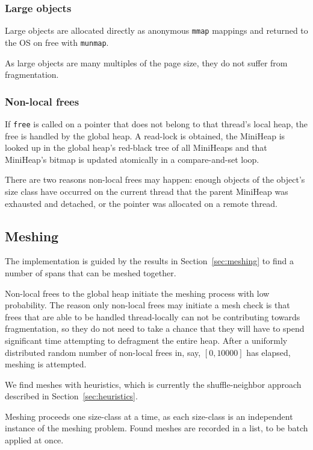 \subsubsection{Large objects}

Large objects are allocated directly as anonymous \texttt{mmap}
mappings and returned to the OS on free with \texttt{munmap}.

As large objects are many multiples of the page size, they do not
suffer from fragmentation.

\subsubsection{Non-local frees}

If \texttt{free} is called on a pointer that does not belong to that
thread's local heap, the free is handled by the global heap.  A
read-lock is obtained, the MiniHeap is looked up in the global heap's
red-black tree of all MiniHeaps and that MiniHeap's bitmap is updated
atomically in a compare-and-set loop.

There are two reasons non-local frees may happen: enough objects of
the object's size class have occurred on the current thread that the
parent MiniHeap was exhausted and detached, or the pointer was
allocated on a remote thread.

\subsection{Meshing}

The \Mesh implementation is guided by the results in
Section~\ref{sec:meshing} to find a number of spans that can be meshed
together.

Non-local frees to the global heap initiate the meshing process with
low probability.  The reason only non-local frees may initiate a mesh
check is that frees that are able to be handled thread-locally can not
be contributing towards fragmentation, so they do not need to take a
chance that they will have to spend significant time attempting to
defragment the entire heap.  After a uniformly distributed random
number of non-local frees in, say, $[0,10000]$ has elapsed, meshing is
attempted.

We find meshes with heuristics, which is currently the
shuffle-neighbor approach described in Section~\ref{sec:heuristics}.

Meshing proceeds one size-class at a time, as each size-class is an
independent instance of the meshing problem.  Found meshes are
recorded in a list, to be batch applied at once.

